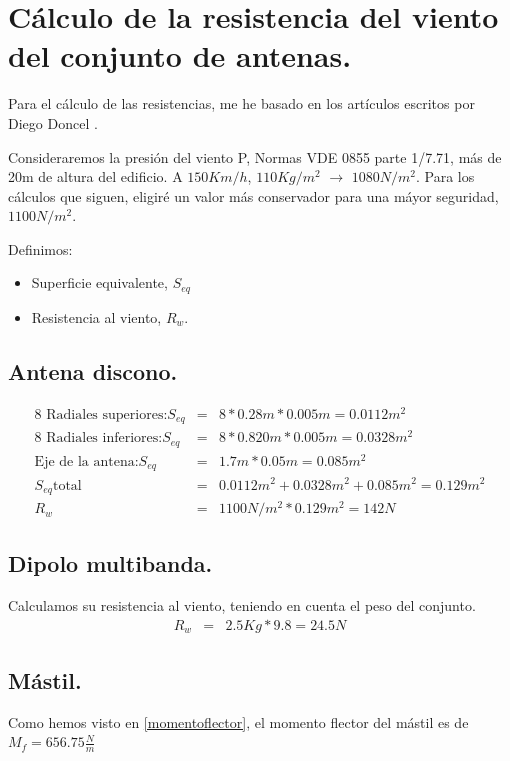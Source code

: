 \documentclass[letterpaper, 10pt]{article} %
\begin{document}
\newpage

\section{Cálculo de la resistencia del viento del conjunto de antenas.}

Para el cálculo de las resistencias, me he basado en los artículos escritos por Diego Doncel \cite{EA1CN}.

Consideraremos la presión del viento P, Normas VDE 0855 parte 1/7.71, más de 20m de altura del edificio. 
A $150 Km/h$, $110 Kg/m^2$ $\rightarrow$ $1080 N/m^2$.
Para los cálculos que siguen, eligiré un valor más conservador para una máyor seguridad, $1100 N/m^2$. 


Definimos: 
\begin{itemize}
	\item Superficie equivalente, $S_{eq}$
	\item Resistencia al viento, $R_{w}$.
\end{itemize}

\subsection{Antena discono.}

\begin{eqnarray}
\text{8 Radiales superiores:} S_{eq} &=& 8 * 0.28m * 0.005m = 0.0112m^{2} \\
\text{8 Radiales inferiores:} S_{eq} &=& 8 * 0.820m * 0.005m = 0.0328m^{2}\\
\text{Eje de la antena:} S_{eq} &=& 1.7m * 0.05m = 0.085m^{2} \\
S_{eq}  \text{total}  &=& 0.0112m^{2} + 0.0328m^{2} +  0.085m^{2} = 0.129m^{2} \\
R_{w} &=& 1100N/m^{2} * 0.129m^{2} = 142N
\end{eqnarray}

\subsection{Dipolo multibanda.}
Calculamos su resistencia al viento, teniendo en cuenta el peso del conjunto.
\begin{eqnarray}
R_{w} &=& 2.5Kg * 9.8 = 24.5N 
\end{eqnarray}


\subsection{Mástil.}
Como hemos visto en \ref{momentoflector}, el momento flector del mástil es de $M_f = 656.75 \frac{N}{m}$
\end{document}
